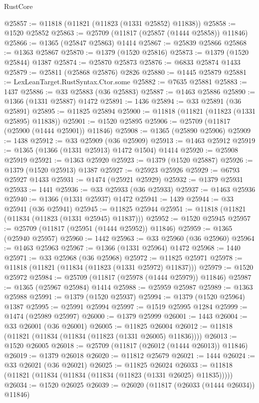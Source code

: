 \begin{lexlean}{RustCore}
\begin{coremodule}
@25857 := @11818 (@11821 (@11823 (@1331 @25852) @11838))
@25858 := @1520 @25852
@25863 := @25709 (@11817 (@25857 (@1444 @25858)) @11846)
@25866 := @1365 (@25847 @25863) @1414
@25867 := @25839 @25866
@25868 := @1363 @25867
@25870 := @1379 (@1520 @25816)
@25873 := @1379 (@1520 @25844) @1387
@25874 := @25870 @25873
@25876 := @6833 @25874 @1433
@25879 := @25811 (@25868 @25876) @2826
@25880 := @1445 @25879
@25881 := LexLeanTarget.RustSyntax.Ctor.some
@25882 := @7635 @25881
@25883 := 1437
@25886 := @33 @25883 (@36 @25883)
@25887 := @1463 @25886
@25890 := @1366 (@1331 @25887) @1472
@25891 := 1436
@25894 := @33 @25891 (@36 @25891)
@25895 := @11825 @25894
@25900 := @11818 (@11821 (@11823 (@1331 @25895) @11838))
@25901 := @1520 @25895
@25906 := @25709 (@11817 (@25900 (@1444 @25901)) @11846)
@25908 := @1365 (@25890 @25906)
@25909 := 1438
@25912 := @33 @25909 (@36 @25909)
@25913 := @1463 @25912
@25919 := @1365 (@1366 (@1331 @25913) @1472 @1504) @1414
@25920 := @25908 @25919
@25921 := @1363 @25920
@25923 := @1379 (@1520 @25887)
@25926 := @1379 (@1520 @25913) @1387
@25927 := @25923 @25926
@25929 := @6793 @25927 @1433
@25931 := @1474 (@25921 @25929)
@25932 := @1379 @25931
@25933 := 1441
@25936 := @33 @25933 (@36 @25933)
@25937 := @1463 @25936
@25940 := @1366 (@1331 @25937) @1472
@25941 := 1439
@25944 := @33 @25941 (@36 @25941)
@25945 := @11825 @25944
@25951 := @11818 (@11821 (@11834 (@11823 (@1331 @25945) @11837)))
@25952 := @1520 @25945
@25957 := @25709 (@11817 (@25951 (@1444 @25952)) @11846)
@25959 := @1365 (@25940 @25957)
@25960 := 1442
@25963 := @33 @25960 (@36 @25960)
@25964 := @1463 @25963
@25967 := @1366 (@1331 @25964) @1472
@25968 := 1440
@25971 := @33 @25968 (@36 @25968)
@25972 := @11825 @25971
@25978 := @11818 (@11821 (@11834 (@11823 (@1331 @25972) @11837)))
@25979 := @1520 @25972
@25984 := @25709 (@11817 (@25978 (@1444 @25979)) @11846)
@25987 := @1365 (@25967 @25984) @1414
@25988 := @25959 @25987
@25989 := @1363 @25988
@25991 := @1379 (@1520 @25937)
@25994 := @1379 (@1520 @25964) @1387
@25995 := @25991 @25994
@25997 := @1519 @25995 @1284
@25999 := @1474 (@25989 @25997)
@26000 := @1379 @25999
@26001 := 1443
@26004 := @33 @26001 (@36 @26001)
@26005 := @11825 @26004
@26012 := @11818 (@11821 (@11834 (@11834 (@11823 (@1331 @26005) @11836))))
@26013 := @1520 @26005
@26018 := @25709 (@11817 (@26012 (@1444 @26013)) @11846)
@26019 := @1379 @26018
@26020 := @11812 @25679
@26021 := 1444
@26024 := @33 @26021 (@36 @26021)
@26025 := @11825 @26024
@26033 := @11818 (@11821 (@11834 (@11834 (@11834 (@11823 (@1331 @26025) @11835)))))
@26034 := @1520 @26025
@26039 := @26020 (@11817 (@26033 (@1444 @26034)) @11846)

\end{coremodule}
\end{lexlean}
